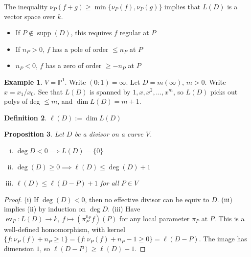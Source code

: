 \documentclass{article}
\theoremstyle{definition}
\newtheorem{defn}{Definition}[section]
\newtheorem{example}[defn]{Example}
\theoremstyle{remark}
\theoremstyle{plain}
\newtheorem{prop}[defn]{Proposition}
\newcommand{\PP}{\mathbb{P}}
\begin{document}
The inequality $\nu_P(f+g)\ge\min\{\nu_P(f),\nu_P(g)\}$ implies that $L(D)$ is a vector space over $k$.
\begin{itemize}
    \item If $P\notin\operatorname{supp}(D)$, this requires $f$ regular at $P$
    \item If $n_P>0$, $f$ has a pole of order $\le n_P$ at $P$
    \item $n_P<0$, $f$ has a zero of order $\ge -n_P$ at $P$
\end{itemize}
\begin{example}
    $V=\PP^1$. Write $(0:1)=\infty$. Let $D=m(\infty)$, $m>0$. Write $x=x_1/x_0$. See that $L(D)$ is spanned by $1,x,x^2,...,x^m$, so $L(D)$ picks out polys of deg $\le m$, and $\dim L(D)=m+1$.
\end{example}
\begin{defn}
    $\ell(D):=\dim L(D)$
\end{defn}
\begin{prop}
    Let $D$ be a divisor on a curve $V$. \begin{enumerate}[(i)]
        \item $\deg D<0\implies L(D)=\{0\}$
        \item $\deg(D)\ge 0\implies \ell(D)\le \deg(D)+1$
        \item $\ell(D)\le \ell(D-P)+1$ for all $P\in V$
    \end{enumerate}
\end{prop}
\begin{proof}
    (i) If $\deg (D)<0$, then no effective divisor can be equiv to $D$.
    (iii) implies (ii) by induction on $\deg D$.
    (iii) Have $\operatorname{ev}_P:L(D)\to k,\ f\mapsto (\pi_P^{n_P}f)(P)$ for any local parameter $\pi_P$ at $P$. This is a well-defined homomorphism, with kernel $\{f:\nu_P(f)+n_P\ge 1\}=\{f:\nu_P(f)+n_P-1\ge 0\}=\ell(D-P)$. The image has dimension $1$, so $\ell(D-P)\ge \ell(D)-1$.
\end{proof}
\end{document}
